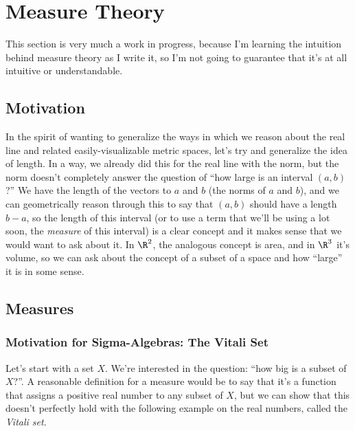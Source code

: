\documentclass[../analysis.tex]{subfiles}
\begin{document}
    \section{Measure Theory}
    This section is very much a work in progress, because I'm learning the intuition behind measure theory as I write it, so I'm not going to guarantee that it's at all intuitive or understandable.

    \subsection{Motivation}

    In the spirit of wanting to generalize the ways in which we reason about the real line and related easily-visualizable metric spaces, let's try and generalize the idea of length. In a way, we already did this for the real line with the norm, but the norm doesn't completely answer the question of ``how large is an interval $(a, b)$?'' We have the length of the vectors to $a$ and $b$ (the norms of $a$ and $b$), and we can geometrically reason through this to say that $(a, b)$ should have a length $b - a$, so the length of this interval (or to use a term that we'll be using a lot soon, the \emph{measure} of this interval) is a clear concept and it makes sense that we would want to ask about it. In $\R^2$, the analogous concept is area, and in $\R^3$ it's volume, so we can ask about the concept of a subset of a space and how ``large'' it is in some sense.


    \subsection{Measures}

    \subsubsection{Motivation for Sigma-Algebras: The Vitali Set}

    Let's start with a set $X$. We're interested in the question: ``how big is a subset of $X$?''. A reasonable definition for a measure would be to say that it's a function that assigns a positive real number to any subset of $X$, but we can show that this doesn't perfectly hold with the following example on the real numbers, called the \emph{Vitali set}. 
\end{document}

